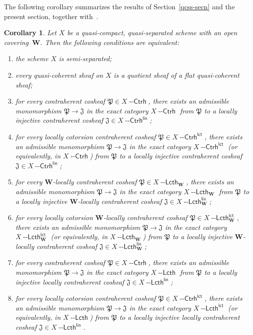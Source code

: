 \documentclass[12pt,a4paper]{amsart}
\newcommand{\+}{\nobreakdash-}
\renewcommand{\:}{\colon}
\newcommand{\rarrow}{\longrightarrow}
\newcommand{\Ctrh}{{\operatorname{\mathsf{--Ctrh}}}}
\newcommand{\Lcth}{{\operatorname{\mathsf{--Lcth}}}}
\newcommand{\lct}{\mathsf{lct}}
\newcommand{\lin}{\mathsf{lin}}
\newcommand{\bW}{\mathbf W}
\newcommand{\fJ}{\mathfrak J}
\newcommand{\fP}{\mathfrak P}
\theoremstyle{plain}
\newtheorem{cor}[thm]{Corollary}
\theoremstyle{definition}
\begin{document}
 The following corollary summarizes the results of
Section~\ref{qcss-secn} and the present section, together
with~\cite[Theorem~2.2]{SS}.

\begin{cor} \label{slavik-stovicek-style-main-corollary}
 Let $X$ be a quasi-compact, quasi-separated scheme with an open
covering\/~$\bW$.
 Then the following conditions are equivalent:
\begin{enumerate}
\item the scheme $X$ is semi-separated;
\item every quasi-coherent sheaf on $X$ is a quotient sheaf of
a flat quasi-coherent sheaf;
\item for every contraherent cosheaf\/ $\fP\in X\Ctrh$, there exists
an admissible monomorphism\/ $\fP\rarrow\fJ$ in the exact category
$X\Ctrh$ from\/ $\fP$ to a locally injective contraherent cosheaf\/
$\fJ\in X\Ctrh^\lin$;
\item for every locally cotorsion contraherent cosheaf\/
$\fP\in X\Ctrh^\lct$, there exists an admissible monomorphism\/
$\fP\rarrow\fJ$ in the exact category $X\Ctrh^\lct$ (or equivalently,
in $X\Ctrh$) from\/ $\fP$ to a locally injective contraherent
cosheaf\/ $\fJ\in X\Ctrh^\lin$;
\item for every\/ $\bW$\+locally contraherent cosheaf\/
$\fP\in X\Lcth_\bW$, there exists an admissible monomorphism\/
$\fP\rarrow\fJ$ in the exact category $X\Lcth_\bW$ from\/ $\fP$
to a locally injective\/ $\bW$\+locally contraherent cosheaf\/
$\fJ\in X\Lcth^\lin_\bW$;
\item for every locally cotorsion\/ $\bW$\+locally contraherent
cosheaf\/ $\fP\in X\Lcth^\lct_\bW$, there exists an admissible
monomorphism\/ $\fP\rarrow\fJ$ in the exact category $X\Lcth^\lct_\bW$
(or equivalently, in $X\Lcth_\bW$) from\/ $\fP$ to a locally injective\/
$\bW$\+locally contraherent cosheaf\/ $\fJ\in X\Lcth^\lin_\bW$;
\item for every contraherent cosheaf\/ $\fP\in X\Ctrh$, there exists
an admissible monomorphism\/ $\fP\rarrow\fJ$ in the exact category
$X\Lcth$ from\/ $\fP$ to a locally injective locally contraherent
cosheaf\/ $\fJ\in X\Lcth^\lin$;
\item for every locally cotorsion contraherent cosheaf\/
$\fP\in X\Ctrh^\lct$, there exists an admissible monomorphism\/
$\fP\rarrow\fJ$ in the exact category $X\Lcth^\lct$ (or equivalently,
in $X\Lcth$) from\/ $\fP$ to a locally injective locally contraherent
cosheaf\/ $\fJ\in X\Lcth^\lin$.
\end{enumerate}
\end{cor}
\end{document}
